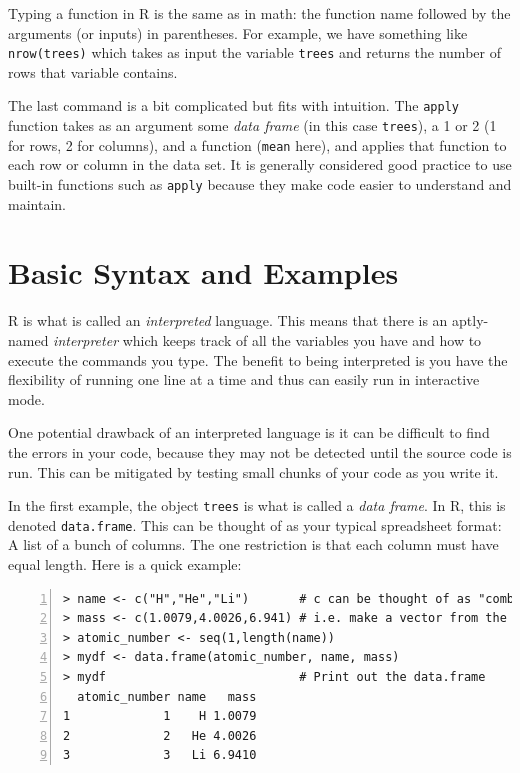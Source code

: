 \documentclass[12pt]{article}
\theoremstyle{remark}
\begin{document}
Typing a function in R is the same as in math: the function name followed by the arguments (or inputs) in parentheses. For example, we have something like \verb|nrow(trees)| which takes as input the variable \verb|trees| and returns the number of rows that variable contains.

The last command is a bit complicated but fits with intuition. The \verb|apply| function takes as an argument some \emph{data frame} (in this case \verb|trees|), a 1 or 2 (1 for rows, 2 for columns), and a function (\verb|mean| here), and applies that function to each row or column in the data set. It is generally considered good practice to use built-in functions such as \verb|apply| because they make code easier to understand and maintain.

\section{Basic Syntax and Examples}

R is what is called an \emph{interpreted} language. This means that there is an aptly-named \emph{interpreter} which keeps track of all the variables you have and how to execute the commands you type. The benefit to being interpreted is you have the flexibility of running one line at a time and thus can easily run in interactive mode.

One potential drawback of an interpreted language is it can be difficult to find the errors in your code, because they may not be detected until the source code is run. This can be mitigated by testing small chunks of your code as you write it.

In the first example, the object \verb|trees| is what is called a \emph{data frame}. In R, this is denoted \verb|data.frame|. This can be thought of as your typical spreadsheet format: A list of a bunch of columns. The one restriction is that each column must have equal length. Here is a quick example:

\begin{Verbatim}[frame=single, fontsize=\small,  numbers=left]
> name <- c("H","He","Li")       # c can be thought of as "combine"
> mass <- c(1.0079,4.0026,6.941) # i.e. make a vector from the arguments
> atomic_number <- seq(1,length(name))
> mydf <- data.frame(atomic_number, name, mass)
> mydf                           # Print out the data.frame
  atomic_number name   mass
1             1    H 1.0079
2             2   He 4.0026
3             3   Li 6.9410
\end{Verbatim}
\end{document}
